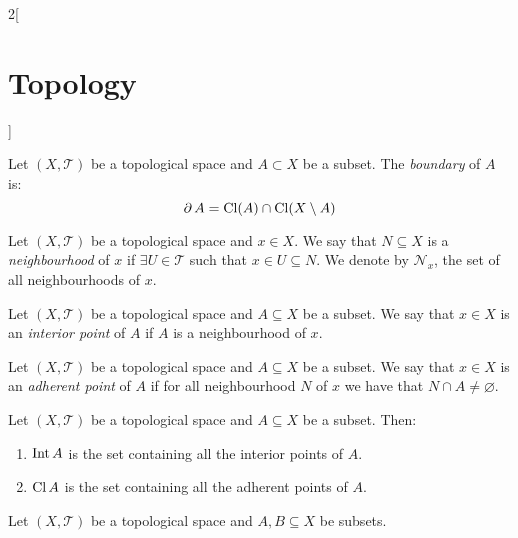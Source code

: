 \documentclass[../../../main.tex]{subfiles}
\begin{document}
\begin{multicols}{2}[\section{Topology}]
\begin{prop}
  \end{prop}
  \begin{definition}
    Let $(X,\mathcal{T})$ be a topological space and $A\subset X$ be a subset. The \textit{boundary} of $A$ is: $$\operatorname{\partial} A=\operatorname{Cl}(A)\cap\operatorname{Cl}(X\setminus A)$$
  \end{definition}
  \begin{definition}
    Let $(X,\mathcal{T})$ be a topological space and $x\in X$. We say that $N\subseteq X$ is a \textit{neighbourhood} of $x$ if $\exists U\in\mathcal{T}$ such that $x\in U\subseteq N$. We denote by $\mathcal{N}_x$, the set of all neighbourhoods of $x$.
  \end{definition}
  \begin{definition}
    Let $(X,\mathcal{T})$ be a topological space and $A\subseteq X$ be a subset. We say that $x\in X$ is an \textit{interior point} of $A$ if $A$ is a neighbourhood of $x$.
  \end{definition}
  \begin{definition}
    Let $(X,\mathcal{T})$ be a topological space and $A\subseteq X$ be a subset. We say that $x\in X$ is an \textit{adherent point} of $A$ if for all neighbourhood $N$ of $x$ we have that $N\cap A\ne\varnothing$.
  \end{definition}
  \begin{prop}
    Let $(X,\mathcal{T})$ be a topological space and $A\subseteq X$ be a subset. Then:
    \begin{enumerate}
      \item $\operatorname{Int} A$ is the set containing all the interior points of $A$.
      \item $\operatorname{Cl} A$ is the set containing all the adherent points of $A$.
    \end{enumerate}
  \end{prop}
  \begin{prop}
    Let $(X,\mathcal{T})$ be a topological space and $A,B\subseteq X$ be subsets.


\end{prop}
\end{multicols}
\end{document}
